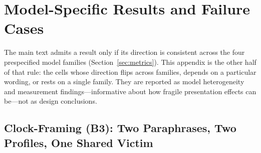\section{Model-Specific Results and Failure Cases}\label{app:heterogeneity}

The main text admits a result only if its direction is consistent across the four prespecified model families (Section~\ref{sec:metrics}). This appendix is the other half of that rule: the cells whose direction flips across families, depends on a particular wording, or rests on a single family. They are reported as model heterogeneity and measurement findings---informative about how fragile presentation effects can be---not as design conclusions.

\subsection{Clock-Framing (B3): Two Paraphrases, Two Profiles, One Shared Victim}\label{app:heterogeneity-b3}

